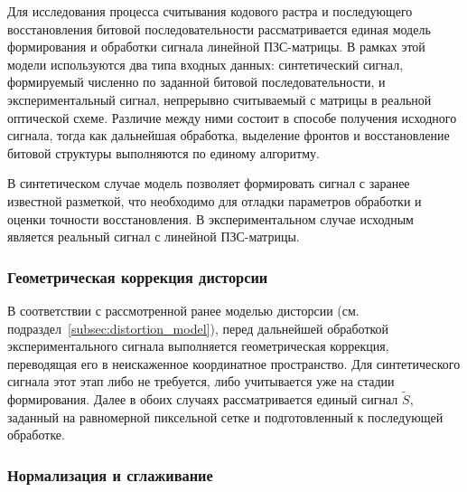 Для исследования процесса считывания кодового растра и последующего восстановления битовой последовательности рассматривается единая модель формирования и обработки сигнала линейной ПЗС-матрицы. В рамках этой модели используются два типа входных данных: синтетический сигнал, формируемый численно по заданной битовой последовательности, и экспериментальный сигнал, непрерывно считываемый с матрицы в реальной оптической схеме. Различие между ними состоит в способе получения исходного сигнала, тогда как дальнейшая обработка, выделение фронтов и восстановление битовой структуры выполняются по единому алгоритму.

В синтетическом случае модель позволяет формировать сигнал с заранее известной разметкой, что необходимо для отладки параметров обработки и оценки точности восстановления. В экспериментальном случае исходным является реальный сигнал с линейной ПЗС-матрицы.

\subsubsection{Геометрическая коррекция дисторсии}

В соответствии с рассмотренной ранее моделью дисторсии (см. подраздел~\ref{subsec:distortion_model}), перед дальнейшей обработкой экспериментального сигнала выполняется геометрическая коррекция, переводящая его в неискаженное координатное пространство. Для синтетического сигнала этот этап либо не требуется, либо учитывается уже на стадии формирования. Далее в обоих случаях рассматривается единый сигнал $\tilde S$, заданный на равномерной пиксельной сетке и подготовленный к последующей обработке.


\subsubsection{Нормализация и сглаживание}

